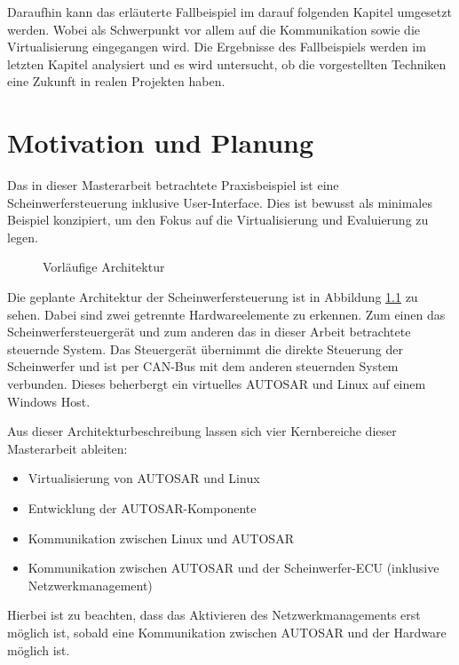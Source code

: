 \documentclass[
  a4paper,					    %
  twoside,
  DIV=calc,     				%
  bibliography=totoc,
  cleardoublepage=empty,
  ngerman,     					%
  final       					%
]{scrbook}
\begin{document}
Daraufhin kann das erläuterte Fallbeispiel im darauf folgenden Kapitel umgesetzt werden. Wobei als Schwerpunkt vor allem auf die Kommunikation sowie die Virtualisierung eingegangen wird. Die Ergebnisse des Fallbeispiels werden im letzten Kapitel analysiert und es wird untersucht, ob die vorgestellten Techniken eine Zukunft in realen Projekten haben.




\chapter{Motivation und Planung}
\label{sec:MotivationPlanung}
Das in dieser Masterarbeit betrachtete Praxisbeispiel ist eine Scheinwerfersteuerung inklusive User-Interface. Dies ist bewusst als minimales Beispiel konzipiert, um den Fokus auf die Virtualisierung und Evaluierung zu legen.

\begin{figure}[ht]
    \centering
    
    \caption{Vorläufige Architektur}
    \label{fig:arch_begin}
\end{figure}

Die geplante Architektur der Scheinwerfersteuerung ist in Abbildung \ref{fig:arch_begin} zu sehen. Dabei sind zwei getrennte Hardwareelemente zu erkennen. Zum einen das Scheinwerfersteuergerät und zum anderen das in dieser Arbeit betrachtete steuernde System. Das Steuergerät übernimmt die direkte Steuerung der Scheinwerfer und ist per CAN-Bus mit dem anderen steuernden System verbunden.  Dieses beherbergt ein virtuelles AUTOSAR und Linux auf einem Windows Host.

Aus dieser Architekturbeschreibung lassen sich vier Kernbereiche dieser Masterarbeit ableiten:

\begin{itemize}
    \item Virtualisierung von AUTOSAR und Linux
    \item Entwicklung der AUTOSAR-Komponente
    \item Kommunikation zwischen Linux und AUTOSAR
    \item Kommunikation zwischen AUTOSAR und der Scheinwerfer-ECU (inklusive Netzwerkmanagement)
\end{itemize}

Hierbei ist zu beachten, dass das Aktivieren des Netzwerkmanagements erst möglich ist, sobald eine Kommunikation zwischen AUTOSAR und der Hardware möglich ist.
\end{document}
